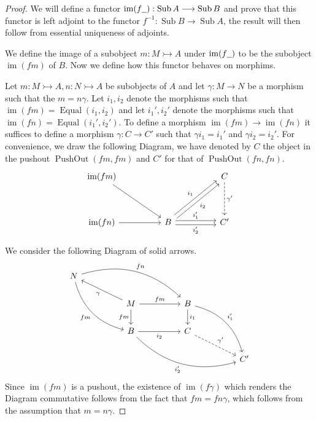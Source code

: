 \documentclass{birkjour}
\theoremstyle{plain}
\theoremstyle{definition}
\newcommand{\und}[1]{\underline{\hspace{#1 cm}}}
\newcommand{\lto}{\longrightarrow}
\begin{document}
	\begin{proof}
		We will define a functor $\operatorname{im}(f\und{0.2}): \operatorname{Sub}A \lto \operatorname{Sub}B$ and prove that this functor is left adjoint to the functor $f^{-1}: \operatorname{Sub}B \lto \operatorname{Sub}A$, the result will then follow from essential uniqueness of adjoints.
		
		We define the image of a subobject $m: M \rightarrowtail A$ under $\operatorname{im}(f\und{0.2})$ to be the subobject $\operatorname{im}(fm)$ of $B$. Now we define how this functor behaves on morphims.
		
		Let $m: M \rightarrowtail A, n:N \rightarrowtail A$ be subobjects of $A$ and let $\gamma: M \lto N$ be a morphism such that the $m = n\gamma$. Let $i_1,i_2$ denote the morphisms such that $\operatorname{im}(fm) = \operatorname{Equal}(i_1,i_2)$ and let $i_1',i_2'$ denote the morphisms such that $\operatorname{im}(fn) = \operatorname{Equal}(i_1',i_2')$. To define a morphism $\operatorname{im}(fm) \lto \operatorname{im}(fn)$ it suffices to define a morphism $\gamma: C \lto C'$ such that $\gamma i_1 = i_1'$ and $\gamma i_2 = i_2'$. For convenience, we draw the following Diagram, we have denoted by $C$ the object in the pushout $\operatorname{PushOut}(fm,fm)$ and $C'$ for that of $\operatorname{PushOut}(fn,fn)$.
		\begin{equation}
			\begin{tikzcd}[column sep = huge, row sep = huge]
				\operatorname{im}(fm)\arrow[dr] & & C\arrow[d,dashed,"{\gamma'}"]\\
				\operatorname{im}(fn)\arrow[r] & B\arrow[ur,shift left,"{i_1}"]\arrow[ur,shift right,swap,"{i_2}"]\arrow[r,shift left,"{i_1'}"]\arrow[r,shift right,swap,"{i_2'}"] & C'
			\end{tikzcd}
		\end{equation}
		
		
		We consider the following Diagram of solid arrows.
		\begin{equation}
			\begin{tikzcd}[column sep = huge]
				N\arrow[rrd, bend left,"{fn}"]\arrow[ddr,swap,bend right,"{fm}"]\\
				& M\arrow[r,"{fm}"]\arrow[d,swap,"{fm}"]\arrow[ul,"{\gamma}"] & B\arrow[d,"{i_1}"]\arrow[ddr,bend left,"{i_1'}"]\\
				& B\arrow[r,swap,"{i_2}"]\arrow[drr,swap,bend right,"{i_2'}"] & C\arrow[dr,dashed,"{\gamma'}"]\\
				& & & C'
			\end{tikzcd}
		\end{equation}
		Since $\operatorname{im}(fm)$ is a pushout, the existence of $\operatorname{im}(f\gamma)$ which renders the Diagram commutative follows from the fact that $fm = fn \gamma$, which follows from the assumption that $m = n \gamma$.
		

\end{proof}
\end{document}
